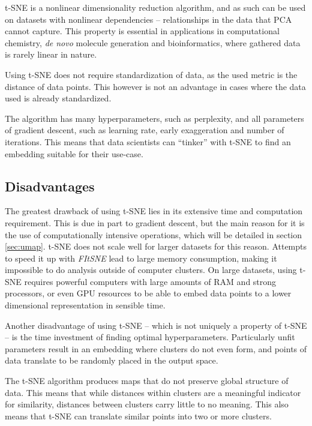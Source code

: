 t-SNE is a nonlinear dimensionality reduction algorithm, and as such can be used on datasets with nonlinear dependencies -- relationships in the data that PCA cannot capture. This property is essential in applications in computational chemistry, \textit{de novo} molecule generation and bioinformatics, where gathered data is rarely linear in nature.

Using t-SNE does not require standardization of data, as the used metric is the distance of data points. This however is not an advantage in cases where the data used is already standardized.

The algorithm has many hyperparameters, such as perplexity, and all parameters of gradient descent, such as learning rate, early exaggeration and number of iterations. This means that data scientists can ``tinker'' with t-SNE to find an embedding suitable for their use-case.

\subsection{Disadvantages}

The greatest drawback of using t-SNE lies in its extensive time and computation requirement. This is due in part to gradient descent, but the main reason for it is the use of computationally intensive operations, which will be detailed in section \ref{sec:umap}. t-SNE does not scale well for larger datasets for this reason. Attempts to speed it up with \textit{FItSNE}\cite{bib:tsne:FItSNE} lead to large memory consumption, making it impossible to do analysis outside of computer clusters. On large datasets, using t-SNE requires powerful computers with large amounts of RAM and strong processors, or even GPU resources to be able to embed data points to a lower dimensional representation in sensible time.

Another disadvantage of using t-SNE -- which is not uniquely a property of t-SNE -- is the time investment of finding optimal hyperparameters. Particularly unfit parameters result in an embedding where clusters do not even form, and points of data translate to be randomly placed in the output space.\cite{bib:distill}

The t-SNE algorithm produces maps that do not preserve global structure of data. This means that while distances within clusters are a meaningful indicator for similarity, distances between clusters carry little to no meaning. This also means that t-SNE can translate similar points into two or more clusters.

